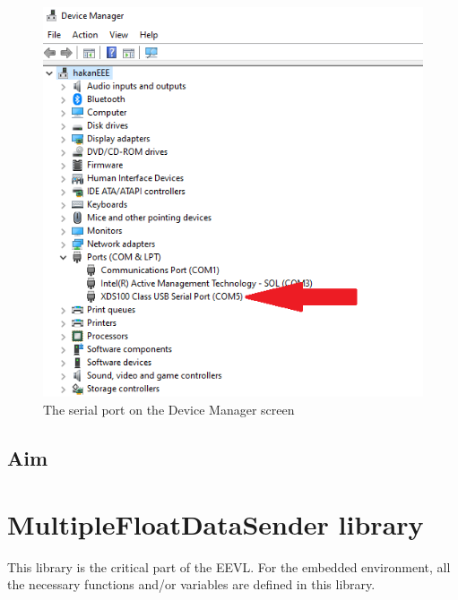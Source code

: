 \documentclass{article}
\begin{document}
\begin{figure}[H]
	\centering
	\includegraphics[scale=0.5]{Figures/DeviceManager.png}
	\caption{The serial port on the Device Manager screen}
	\label{fig:DeviceManager}
	\end{figure}

\subsection{Aim}

\section{MultipleFloatDataSender library}
This library is the critical part of the EEVL. For the embedded environment, all the necessary functions and/or variables are defined in this library. 




\end{document}
